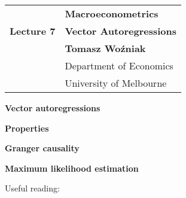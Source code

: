 \documentclass[notes,blackandwhite,mathsans,usenames,dvipsnames]{beamer}
\begin{document}






{
\begin{frame}

\vspace{1cm}
\begin{tabular}{rl}
&\textbf{\LARGE\color{mcxs1} Macroeconometrics}\\[8ex]
\textbf{\Large Lecture 7}&\textbf{\Large\color{mcxs2}Vector Autoregressions}\\[19ex]
&\textbf{Tomasz Wo\'zniak}\\[1ex]
&{\small\color{mcxs5} Department of Economics}\\
&{\small\color{mcxs5}University of Melbourne}
\end{tabular}

\end{frame}
}



{
\begin{frame}

\vspace{1cm}\textbf{\color{mcxs1} Vector autoregressions}

\bigskip\textbf{\color{mcxs2}Properties}

\bigskip\textbf{\color{mcxs2}Granger causality}

\bigskip\textbf{\color{mcxs2}Maximum likelihood estimation}

\small
\vspace{1cm}Useful reading: \\ \footnotesize
{}

\end{frame}
}
\end{document}
